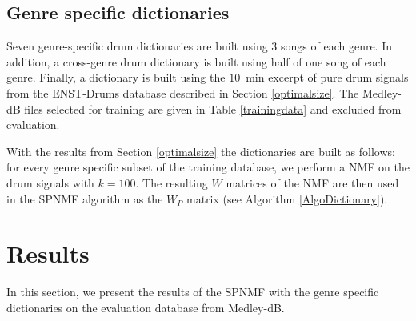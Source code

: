 \documentclass{article}
\begin{document}
\subsection{Genre specific dictionaries}\label{genrespecdict}

Seven genre-specific drum dictionaries are built using $3$ songs of each genre. In addition, a cross-genre drum dictionary is built using half of one song of each genre. Finally, a dictionary is built using the $10$~min excerpt of pure drum signals from the ENST-Drums database described in Section \ref{optimalsize}. The Medley-dB files selected for training are given in Table \ref{trainingdata} and excluded from evaluation. 

With the results from Section \ref{optimalsize} the dictionaries are built as follows: for every genre specific subset of the training database, we perform a NMF on the drum signals with $k=100$. The resulting $W$ matrices of the NMF are then used in the SPNMF algorithm as the  $W_P$ matrix (see Algorithm \ref{AlgoDictionary}).

%   
%  

\vspace{-0.5cm}

\section{Results}\label{sec:results}

In this section, we present the results of the SPNMF with the genre specific dictionaries on the evaluation database from Medley-dB.
\end{document}
